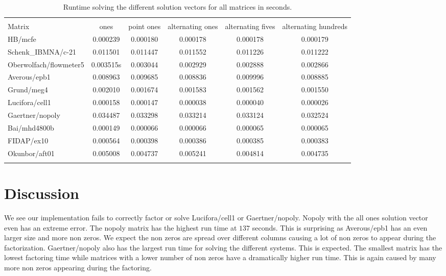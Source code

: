 \documentclass[10pt]{article}
\begin{document}
\begin{table}
    \begin{tabular}{ l c c c c c }
    \firsthline
    \multicolumn{6}{c}{Solving Runtime} \\
    \cline{2-6}
    Matrix & ones & point ones & alternating ones & alternating fives & alternating hundreds \\
    \hline
    HB/mcfe & 0.000239 & 0.000180 & 0.000178 & 0.000178 & 0.000179 \\
    Schenk\_IBMNA/c-21 & 0.011501 & 0.011447 & 0.011552 & 0.011226 & 0.011222 \\
    Oberwolfach/flowmeter5 & 0.003515s & 0.003044 & 0.002929 & 0.002888 & 0.002866 \\
    Averous/epb1 & 0.008963 & 0.009685 & 0.008836 & 0.009996 & 0.008885 \\
    Grund/meg4 & 0.002010 & 0.001674 & 0.001583 & 0.001562 & 0.001550 \\
    Lucifora/cell1 & 0.000158 & 0.000147 & 0.000038 & 0.000040 & 0.000026 \\
    Gaertner/nopoly & 0.034487 & 0.033298 & 0.033214 & 0.033124 & 0.032524 \\
    Bai/mhd4800b & 0.000149 & 0.000066 & 0.000066 & 0.000065 & 0.000065 \\
    FIDAP/ex10 & 0.000564 & 0.000398 & 0.000386 & 0.000385 & 0.000383 \\
    Okunbor/aft01 & 0.005008 & 0.004737 & 0.005241 & 0.004814 & 0.004735 \\
    \lasthline
    \end{tabular}
    \caption{Runtime solving the different solution vectors for all matrices in seconds.}
    \label{tab:solving}
\end{table}

\section{Discussion}
We see our implementation fails to correctly factor or solve Lucifora/cell1 or Gaertner/nopoly. Nopoly with the all ones solution vector even has an extreme error. The nopoly matrix has the highest run time at $137$ seconds. This is surprising as Averous/epb1 has an even larger size and more non zeros. We expect the non zeros are spread over different columns causing a lot of non zeros to appear during the factorization. Gaertner/nopoly also has the largest run time for solving the different systems. This is expected. The smallest matrix has the lowest factoring time while matrices with a lower number of non zeros have a dramatically higher run time. This is again caused by many more non zeros appearing during the factoring.
\end{document}
